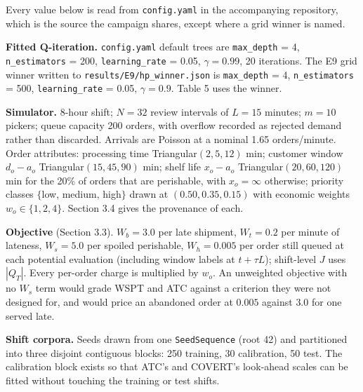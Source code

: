 \documentclass[review,3p,times]{elsarticle}
\theoremstyle{definition}
\begin{document}
Every value below is read from \texttt{config.yaml} in the accompanying
repository, which is the source the campaign shares, except where a grid
winner is named.

\textbf{Fitted Q-iteration.} \texttt{config.yaml} default trees are
\texttt{max\_depth} = 4, \texttt{n\_estimators} = 200,
\texttt{learning\_rate} = 0.05, \(\gamma=0.99\), 20 iterations. The E9
grid winner written to \texttt{results/E9/hp\_winner.json} is
\texttt{max\_depth} = 4, \texttt{n\_estimators} = 500,
\texttt{learning\_rate} = 0.05, \(\gamma=0.9\). Table 5 uses the winner.

\textbf{Simulator.} 8-hour shift; \(N = 32\) review intervals of
\(L = 15\) minutes; \(m = 10\) pickers; queue capacity 200 orders, with
overflow recorded as rejected demand rather than discarded. Arrivals are
Poisson at a nominal 1.65 orders/minute. Order attributes: processing
time Triangular\((2, 5, 12)\) min; customer window \(d_o - a_o\)
Triangular\((15, 45, 90)\) min; shelf life \(x_o - a_o\)
Triangular\((20, 60, 120)\) min for the 20\% of orders that are
perishable, with \(x_o = \infty\) otherwise; priority classes \(\{\)low,
medium, high\(\}\) drawn at \((0.50, 0.35, 0.15)\) with economic weights
\(w_o \in \{1, 2, 4\}\). Section 3.4 gives the provenance of each.

\textbf{Objective} (Section 3.3). \(W_b = 3.0\) per late shipment,
\(W_t = 0.2\) per minute of lateness, \(W_s = 5.0\) per spoiled
perishable, \(W_h = 0.005\) per order still queued at each potential
evaluation (including window labels at \(t+\tau L\)); shift-level \(J\)
uses \(|Q_T|\). Every per-order charge is multiplied by \(w_o\). An
unweighted objective with no \(W_s\) term would grade WSPT and ATC
against a criterion they were not designed for, and would price an
abandoned order at \(0.005\) against \(3.0\) for one served late.

\textbf{Shift corpora.} Seeds drawn from one \texttt{SeedSequence} (root
42) and partitioned into three disjoint contiguous blocks: 250 training,
30 calibration, 50 test. The calibration block exists so that ATC's and
COVERT's look-ahead scales can be fitted without touching the training
or test shifts.
\end{document}
